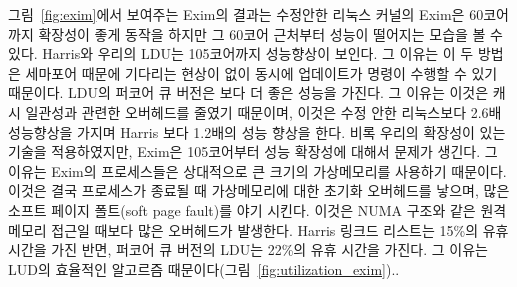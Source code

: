 그림~\ref{fig:exim}에서 보여주는 Exim의 결과는 수정안한 리눅스 커널의 Exim은
 60코어 까지 확장성이 좋게 동작을 하지만 그 60코어 근처부터 성능이 떨어지는 모습을 볼 수 있다. 
Harris와 우리의 LDU는 105코어까지 성능향상이 보인다. 그 이유는 이 두 방법은 세마포어 때문에 
기다리는 현상이 없이 동시에 업데이트가 명령이 수행할 수 있기 때문이다. 
LDU의 퍼코어 큐 버전은 보다 더 좋은 성능을 가진다.
그 이유는 이것은 캐시 일관성과 관련한 오버헤드를 줄였기 때문이며, 이것은 수정 안한 리눅스보다 2.6배 성능향상을
 가지며 Harris 보다 1.2배의 성능 향상을 한다. 
비록 우리의 확장성이 있는 기술을 적용하였지만, Exim은 105코어부터 성능 확장성에 대해서 문제가 생긴다.
그 이유는 Exim의 프로세스들은 상대적으로 큰 크기의 가상메모리를 사용하기 때문이다.
 이것은 결국 프로세스가 종료될 때 가상메모리에 대한 초기화 오버헤드를 낳으며,
  많은 소프트 페이지 폴트(soft page fault)를 야기 시킨다. 이것은 NUMA 구조와 같은 원격 메모리 접근일 때보다 많은 오버헤드가 발생한다. 
Harris 링크드 리스트는 15\%의 유휴 시간을 가진 반면, 퍼코어 큐 버전의 LDU는 22\%의 유휴 시간을 가진다.
그 이유는 LUD의 효율적인 알고르즘 때문이다(그림~\ref{fig:utilization_exim})..


